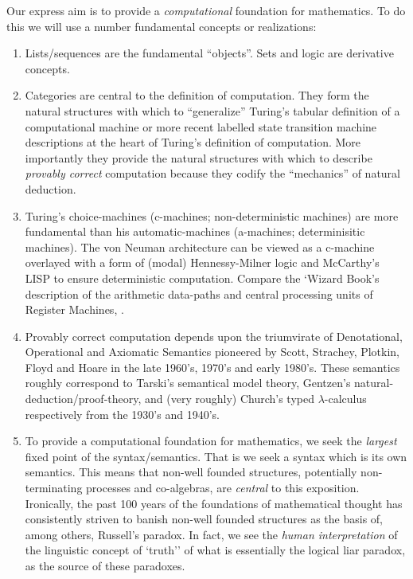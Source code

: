 
Our express aim is to provide a \emph{computational} foundation for mathematics.
To do this we will use a number fundamental concepts or realizations:
\begin{enumerate}
\item	Lists/sequences are the fundamental ``objects''. Sets and logic are
derivative concepts.

\item	Categories are central to the definition of computation. They form the
natural structures with which to ``generalize'' Turing's tabular definition of a
computational machine or more recent labelled state transition machine
descriptions at the heart of Turing's definition of computation. More
importantly they provide the natural structures with which to describe
\emph{provably correct} computation because they codify the ``mechanics'' of
natural deduction.

\item	Turing's choice-machines (c-machines; non-deterministic machines) are more
fundamental than his automatic-machines (a-machines; determinisitic machines).
The von Neuman architecture can be viewed as a c-machine overlayed with a form
of (modal) Hennessy-Milner logic and McCarthy's LISP to ensure deterministic
computation. Compare the `Wizard Book's description of the arithmetic data-paths
and central processing units of Register Machines, \cite[Chapter
5]{abelsonSussmanSussman1996structureInterpretationComputerPrograms}.

\item	Provably correct computation depends upon the triumvirate of Denotational,
Operational and Axiomatic Semantics pioneered by Scott, Strachey, Plotkin, Floyd
and Hoare in the late 1960's, 1970's and early 1980's. These semantics roughly
correspond to Tarski's semantical model theory, Gentzen's
natural-deduction/proof-theory, and (very roughly) Church's typed
$\lambda$-calculus respectively from the 1930's and 1940's.

\item	To provide a computational foundation for mathematics, we seek the
\emph{largest} fixed point of the syntax/semantics.  That is we seek a syntax
which is its own semantics. This means that non-well founded structures,
potentially non-terminating processes and co-algebras, are \emph{central} to
this exposition. Ironically, the past 100 years of the foundations of
mathematical thought has consistently striven to banish non-well founded
structures as the basis of, among others, Russell's paradox. In fact, we see the
\emph{human interpretation} of the linguistic concept of `truth'' of what is
essentially the logical liar paradox, as the source of these paradoxes.


\end{enumerate}
